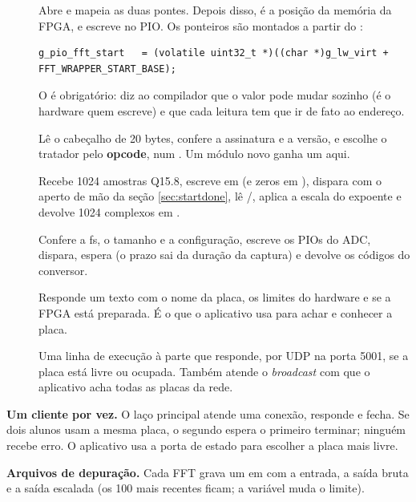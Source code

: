 \documentclass[11pt,a4paper,oneside]{article}
\begin{document}
\begin{description}
  \item[] Abre  e mapeia as duas pontes. Depois
    disso,  é a posição  da memória da FPGA, e
     escreve no PIO. Os ponteiros são montados a
    partir do :
\begin{lstlisting}
g_pio_fft_start   = (volatile uint32_t *)((char *)g_lw_virt + FFT_WRAPPER_START_BASE);
\end{lstlisting}
    O  é obrigatório: diz ao compilador que o valor pode mudar
    sozinho (é o hardware quem escreve) e que cada leitura tem que ir de fato
    ao endereço.
  \item[] Lê o cabeçalho de 20 bytes, confere a
    assinatura  e a versão, e escolhe o tratador pelo
    \textbf{opcode}, num . Um módulo novo ganha um  aqui.
  \item[] Recebe 1024 amostras Q15.8, escreve em
     (e zeros em ), dispara com o aperto de
    mão da seção \ref{sec:startdone}, lê /,
    aplica a escala do expoente e devolve 1024 complexos em .
  \item[] Confere a fs, o tamanho e a configuração, escreve
    os PIOs do ADC, dispara, espera (o prazo sai da duração da captura) e
    devolve os códigos do conversor.
  \item[] Responde um texto  com o nome da
    placa, os limites do hardware e se a FPGA está preparada. É o que o
    aplicativo usa para achar e conhecer a placa.
  \item[] Uma linha de execução à parte que responde, por
    UDP na porta 5001, se a placa está livre ou ocupada. Também atende o
    \emph{broadcast} com que o aplicativo acha todas as placas da rede.
\end{description}

\textbf{Um cliente por vez.} O laço principal atende uma conexão, responde e
fecha. Se dois alunos usam a mesma placa, o segundo espera o primeiro
terminar; ninguém recebe erro. O aplicativo usa a porta de estado para
escolher a placa mais livre.

\textbf{Arquivos de depuração.} Cada FFT grava um  em
 com a entrada, a saída bruta e a saída escalada (os 100
mais recentes ficam; a variável  muda o limite).
\end{document}
